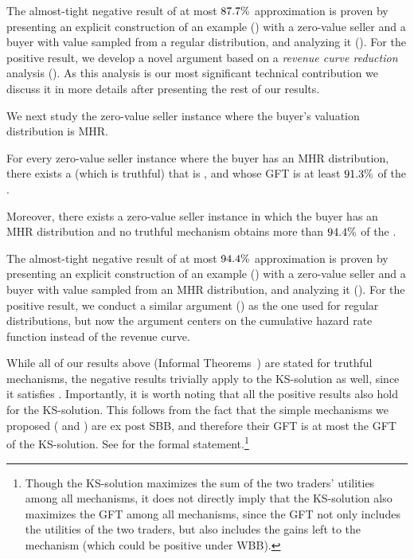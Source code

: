 The almost-tight negative result of at most ${87.7\%}$ approximation is proven by presenting an explicit construction of an example () with a zero-value seller and a buyer with value sampled from a regular distribution, and analyzing it (). For the positive result, we develop a novel argument based on a \emph{revenue curve reduction} analysis (). As this analysis is our most significant technical contribution we discuss it in more details after presenting the rest of our results.

We next study the zero-value seller instance where the buyer's valuation distribution is MHR.  
\begin{informal}
\label{infmthm:mhr buyer}
    For every zero-value seller instance where the buyer has an MHR distribution, there exists a {\FixPrice} (which is  truthful) that is {\ksfair}, and whose GFT is at least ${91.3\%}$ of the {\SecondBest}.

    Moreover, there exists a zero-value seller instance in which the buyer has an MHR distribution and no {\ksfair} truthful mechanism obtains more than ${94.4\%}$ of the {\SecondBest}. 
\end{informal}
The almost-tight negative result of at most ${94.4\%}$ approximation is proven by presenting an explicit construction of an example () with a zero-value seller and a buyer with value sampled from an MHR distribution, and analyzing it (). For the positive result, we conduct a similar argument () as the one used for regular distributions, but now the argument centers on the cumulative hazard rate function instead of the revenue curve. 



While all of our results above (Informal Theorems~) are stated for {\ksfair} truthful mechanisms, the negative results trivially apply to the KS-solution as well, since it satisfies {\ksfairness}. Importantly, it is worth noting that all the positive results also hold for the KS-solution. This follows from the fact that the simple {\ksfair} mechanisms we proposed ({\BiasedRandomOffer} and {\FixPrice}) are ex post SBB, and therefore their GFT is at most the GFT of the KS-solution. See  for the formal statement.\footnote{Though the KS-solution maximizes the sum of the two traders' utilities among all {\ksfair} mechanisms, it does not directly imply that the KS-solution also maximizes the GFT among all {\ksfair} mechanisms, since the GFT {not only includes the utilities of the two  traders, but also includes} the gains left to the mechanism (which could be positive under WBB).}


